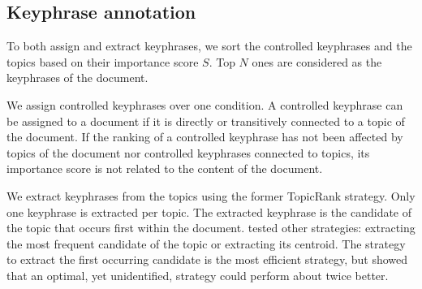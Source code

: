   \subsection{Keyphrase annotation}
  \label{subsec:keyphrase_assignment_and_extraction}
    To both assign and extract keyphrases, we sort the controlled
    keyphrases and the topics based on their importance score $S$. Top $N$ ones are
    considered as the keyphrases of the document.

    We assign controlled keyphrases over one condition. A controlled keyphrase can
    be assigned to a document if it is directly or transitively connected to a
    topic of the document. If the ranking of a controlled keyphrase has not been
    affected by topics of the document nor controlled keyphrases connected to topics,
    its importance score is not related to the content of the document.

    We extract keyphrases from the topics using the former TopicRank strategy.
    Only one keyphrase is extracted per topic. The extracted keyphrase is the
    candidate of the topic that occurs first within the document.
     tested other strategies: extracting the most
    frequent candidate of the topic or extracting its centroid. The strategy to
    extract the first occurring candidate is the most efficient strategy, but
     showed that an optimal, yet unidentified, strategy could
    perform about twice better.

